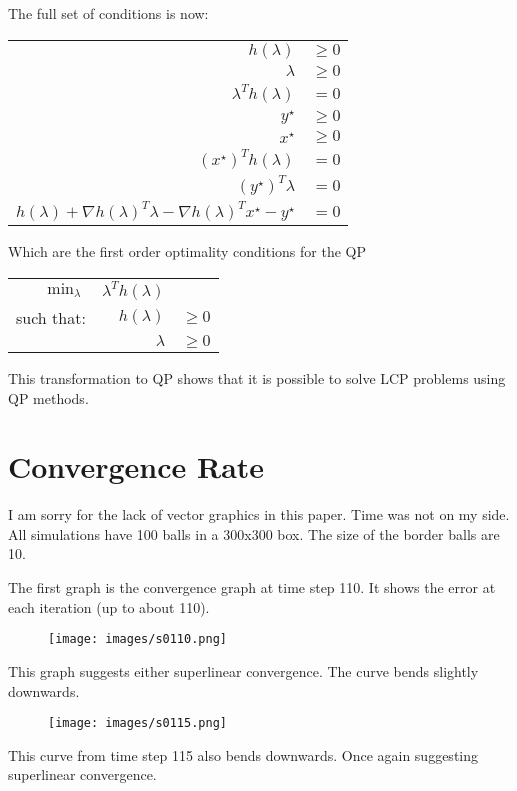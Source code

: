 \documentclass[10pt,oneside,a4paper,final,english]{memoir}
\begin{document}
The full set of conditions is now:
\begin{center}\begin{tabular}{rl}
$h(\lambda)$ & $\geq 0$ \\
$\lambda$ & $\geq 0$\\
$\lambda^T h(\lambda)$ & $= 0$\\

$y^\star $&$\geq 0$ \\
$x^\star $&$\geq 0$ \\
$(x^\star)^T h(\lambda)$&$= 0$ \\

$(y^\star)^T \lambda $&$= 0$ \\

$h(\lambda) + \nabla h(\lambda)^T \lambda - \nabla h(\lambda)^T
x^\star - y^\star $&$= 0$
\end{tabular}\end{center}

Which are the first order optimality conditions for the QP
\begin{center}\begin{tabular}{rrl}
$\min_\lambda$ & $\lambda^T h(\lambda)$ & \\
such that: & $h(\lambda)$ & $\geq 0$ \\
           & $\lambda $ & $\geq 0$
\end{tabular}\end{center}

This transformation to QP shows that it is possible to solve LCP
problems using QP methods.


\section{Convergence Rate}
I am sorry for the lack of vector graphics in this paper. Time was not
on my side. All simulations have 100 balls in a 300x300 box. The size
of the border balls are 10.

The first graph is the convergence graph at time step 110. It shows
the error at each iteration (up to about 110).
\begin{figure}[H]
\texttt{[image: images/s0110.png]}
\end{figure}
This graph suggests either superlinear convergence. The curve bends
slightly downwards.


\begin{figure}[H]
\texttt{[image: images/s0115.png]}
\end{figure}
This curve from time step 115 also bends downwards. Once again
suggesting superlinear convergence.
\end{document}
